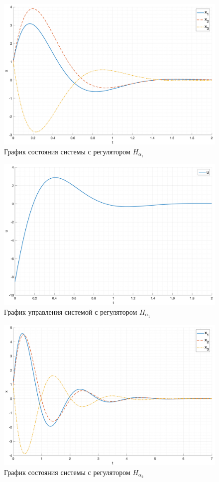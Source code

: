 \begin{figure}[ht!]
    \centering
    \includegraphics[width=\textwidth]{media/plots/task1_3_x.png}
    \caption{График состояния системы с регулятором $H_{\alpha_1}$}
    \label{fig:task1_3_x}
\end{figure}
\begin{figure}[ht!]
    \centering
    \includegraphics[width=\textwidth]{media/plots/task1_3_u.png}
    \caption{График управления системой с регулятором $H_{\alpha_1}$}
    \label{fig:task1_3_u}
\end{figure}
\begin{figure}[ht!]
    \centering
    \includegraphics[width=\textwidth]{media/plots/task1_4_x.png}
    \caption{График состояния системы с регулятором $H_{\alpha_2}$}
    \label{fig:task1_4_x}
\end{figure}
